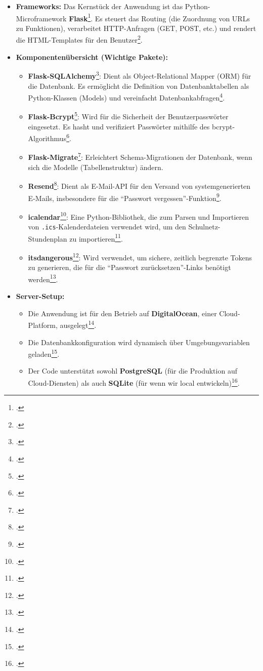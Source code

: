 \documentclass[12pt,a4paper]{report}
\begin{document}
\begin{itemize}
    \item \textbf{Frameworks:}
    Das Kernstück der Anwendung ist das Python-Microframework \textbf{Flask}\footcite{app.py}. Es steuert das Routing (die Zuordnung von URLs zu Funktionen), verarbeitet HTTP-Anfragen (GET, POST, etc.) und rendert die HTML-Templates für den Benutzer\footcite{app.py}.

    \item \textbf{Komponentenübersicht (Wichtige Pakete):}
    \begin{itemize}
        \item \textbf{Flask-SQLAlchemy}\footcite{app.py}: Dient als Object-Relational Mapper (ORM) für die Datenbank. Es ermöglicht die Definition von Datenbanktabellen als Python-Klassen (Models) und vereinfacht Datenbankabfragen\footcite{app.py}.
        \item \textbf{Flask-Bcrypt}\footcite{app.py}: Wird für die Sicherheit der Benutzerpasswörter eingesetzt. Es hasht und verifiziert Passwörter mithilfe des bcrypt-Algorithmus\footcite{app.py, main.tex}.
        \item \textbf{Flask-Migrate}\footcite{app.py}: Erleichtert Schema-Migrationen der Datenbank, wenn sich die Modelle (Tabellenstruktur) ändern.
        \item \textbf{Resend}\footcite{app.py}: Dient als E-Mail-API für den Versand von systemgenerierten E-Mails, insbesondere für die \enquote{Passwort vergessen}-Funktion\footcite{app.py, main.tex}.
        \item \textbf{icalendar}\footcite{app.py}: Eine Python-Bibliothek, die zum Parsen und Importieren von \texttt{.ics}-Kalenderdateien verwendet wird, um den Schulnetz-Stundenplan zu importieren\footcite{app.py, main.tex}.
        \item \textbf{itsdangerous}\footcite{app.py}: Wird verwendet, um sichere, zeitlich begrenzte Tokens zu generieren, die für die \enquote{Passwort zurücksetzen}-Links benötigt werden\footcite{app.py}.
    \end{itemize}

    \item \textbf{Server-Setup:}
    \begin{itemize}
        \item Die Anwendung ist für den Betrieb auf \textbf{DigitalOcean}, einer Cloud-Platform, ausgelegt\footcite{main.tex}.
        \item Die Datenbankkonfiguration wird dynamisch über Umgebungsvariablen geladen\footcite{app.py}.
        \item Der Code unterstützt sowohl \textbf{PostgreSQL} (für die Produktion auf Cloud-Diensten) als auch \textbf{SQLite} (für wenn wir local entwickeln)\footcite{app.py, main.tex}.
    \end{itemize}
\end{itemize}
\end{document}
